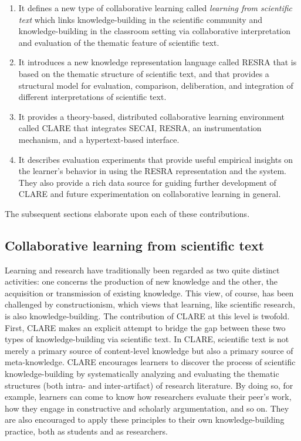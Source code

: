 \begin{enumerate}
\item It defines a new type of collaborative learning called {\it
  learning from scientific text} which links knowledge-building in the
  scientific community and knowledge-building in the classroom setting
  via collaborative interpretation and evaluation of the thematic feature
  of scientific text.
  
\item It introduces a new knowledge representation language called RESRA
  that is based on the thematic structure of scientific text, and that
  provides a structural model for evaluation, comparison, deliberation, and
  integration of different interpretations of scientific text.
  
\item It provides a theory-based, distributed collaborative learning
  environment called CLARE that integrates SECAI, RESRA, an
  instrumentation mechanism, and a hypertext-based interface.
  
\item It describes evaluation experiments that provide useful empirical
  insights on the learner's behavior in using the RESRA representation and
  the system. They also provide a rich data source for guiding further
  development of CLARE and future experimentation on collaborative learning
  in general.
\end{enumerate}

The subsequent sections elaborate upon each of these contributions.


\subsection{Collaborative learning from scientific text}

Learning and research have traditionally been regarded as two quite
distinct activities: one concerns the production of new knowledge and the
other, the acquisition or transmission of existing knowledge. This view, of
course, has been challenged by constructionism, which views that learning,
like scientific research, is also knowledge-building. The contribution of
CLARE at this level is twofold. First, CLARE makes an explicit attempt to
bridge the gap between these two types of knowledge-building via scientific
text. In CLARE, scientific text is not merely a primary source of
content-level knowledge but also a primary source of meta-knowledge. CLARE
encourages learners to discover the process of scientific
knowledge-building by systematically analyzing and evaluating the thematic
structures (both intra- and inter-artifact) of research literature. By
doing so, for example, learners can come to know how researchers evaluate
their peer's work, how they engage in constructive and scholarly
argumentation, and so on. They are also encouraged to apply these
principles to their own knowledge-building practice, both as students and
as researchers.

